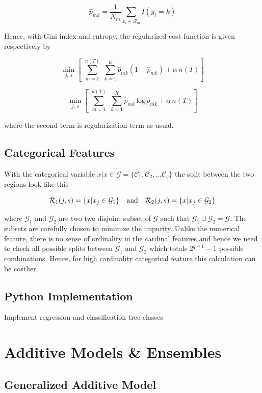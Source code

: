 \documentclass[11pt]{article}
\theoremstyle{definition}
\begin{document}
$$
\hat{p}_{mk} =\frac{1}{N_m} \sum_{x_i \in \mathcal{R}_m} I (y_i = k)
$$

Hence, with Gini index and entropy, the regularized cost function is given respectively by 

$$
\min_{j,\, s} \left[\,\, \sum_{m=1}^{n(T)} \, \, \sum_{k=1}^K \hat{p}_{mk} (1 - \hat{p}_{mk}) + \alpha \, n(T) \right]
$$

$$
\min_{j,\, s} \left[\,\, \sum_{m=1}^{n(T)} \, \, \sum_{k=1}^K \hat{p}_{mk}\, \text{log}\,\hat{p}_{mk}  + \alpha \, n(T) \right]
$$

where the second term is regularization term as usual.  



\subsection{Categorical Features }


With the categorical variable $x | x \in \mathcal{G} = \{\mathcal{C}_1, \mathcal{C}_2, ... \mathcal{C}_q\}$ the split between the two regions look like this 

$$
\mathcal{R}_1 (j, s) = \{x | x_j \in {\cal{G}}_1\} \quad \text{and} \quad \mathcal{R}_2 (j, s) = \{x | x_j \in {\cal{G}}_2 \}
$$

where $\mathcal{G}_1$ and $\mathcal{G}_2$ are two two disjoint subset of $\mathcal{G}$ such that $\mathcal{G}_1 \cup \mathcal{G}_2 = \mathcal{G}$. The subsets are carefully chosen to minimize the impurity. Unlike the numerical feature, there is no sense of ordinality in the cardinal features and hence we need to check all possible splits between  $\mathcal{G}_1$ and $\mathcal{G}_2$ which totals $2^{q-1}-1$ possible combinations. Hence, for high cardinality categorical feature this calculation can be costlier. 


\subsection{Python Implementation}

Implement regression and classification tree classes 





\newpage
\section{Additive Models \& Ensembles}

\subsection{Generalized Additive Model }
\end{document}
